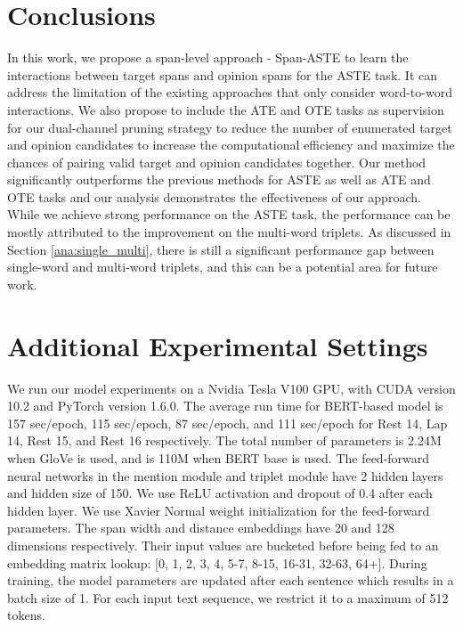 \documentclass[11pt,a4paper]{article}
\begin{document}
\section{Conclusions}
In this work, we propose a span-level approach - Span-ASTE to learn the interactions between target spans and opinion spans for the ASTE task.
It can address the limitation of the existing approaches that only consider word-to-word interactions.
We also propose to include the ATE and OTE tasks as supervision for our dual-channel pruning strategy to reduce the number of enumerated target and opinion candidates to increase the computational efficiency and maximize the chances of pairing valid target and opinion candidates together.
Our method significantly outperforms the previous 
methods for ASTE as well as ATE and OTE tasks and our analysis demonstrates the effectiveness of our approach.
While we achieve strong performance on the ASTE task,
the performance can be mostly attributed to the improvement on the multi-word triplets.
As discussed in Section \ref{ana:single_multi}, there is still a significant 
performance gap between single-word and multi-word triplets,
and this 
can be a potential area for future work.





\appendix


\section{Additional Experimental Settings} 
We run our model experiments on a Nvidia Tesla V100 GPU, with CUDA version 10.2 and PyTorch version 1.6.0. 
The average run time for BERT-based model is 157 sec/epoch, 115 sec/epoch, 87 sec/epoch, and 111 sec/epoch for Rest 14, Lap 14, Rest 15, and Rest 16 respectively.
The total number of parameters is 2.24M when GloVe is used, and is 110M when BERT base is used.
The feed-forward neural networks in the mention module and triplet module have 2 hidden layers and hidden size of 150.
We use ReLU activation and dropout of 0.4 after each hidden layer.
We use Xavier Normal weight initialization for the feed-forward parameters.
The span width and distance embeddings have 20 and 128 dimensions respectively.
Their input values are bucketed \cite{Gardner2017AllenNLP}   before being fed to an embedding matrix lookup: [0, 1, 2, 3, 4, 5-7, 8-15, 16-31, 32-63, 64+].
During training, the model parameters are updated after each sentence which results in a batch size of 1.
For each input text sequence, we restrict it to a maximum of 512 tokens.
\end{document}
